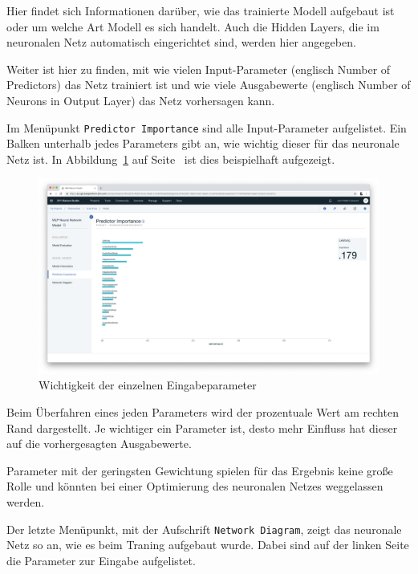 Hier findet sich Informationen darüber, wie das trainierte Modell aufgebaut ist oder um welche Art Modell es sich
handelt. Auch die Hidden Layers, die im neuronalen Netz automatisch eingerichtet sind, werden hier angegeben.

Weiter ist hier zu finden, mit wie vielen Input-Parameter (englisch Number of Predictors) das Netz trainiert ist und wie
viele Ausgabewerte (englisch Number of Neurons in Output Layer) das Netz vorhersagen kann.

Im Menüpunkt \texttt{Predictor Importance} sind alle Input-Parameter aufgelistet. Ein Balken unterhalb jedes Parameters
gibt an, wie wichtig dieser für das neuronale Netz ist. In Abbildung~\ref{fig:umsetzung_model_predictor} auf
Seite~\pageref{fig:umsetzung_model_predictor} ist dies beispielhaft aufgezeigt.

\begin{figure}[h]
    \centering
    \includegraphics[width=\textwidth]{images/kapitel_3/model_predictor.png}
    \caption{Wichtigkeit der einzelnen Eingabeparameter}
    \label{fig:umsetzung_model_predictor}
\end{figure}

Beim Überfahren eines jeden Parameters wird der prozentuale Wert am rechten Rand dargestellt. Je wichtiger ein Parameter
ist, desto mehr Einfluss hat dieser auf die vorhergesagten Ausgabewerte.

Parameter mit der geringsten Gewichtung spielen für das Ergebnis keine große Rolle und könnten bei einer Optimierung des
neuronalen Netzes weggelassen werden.

Der letzte Menüpunkt, mit der Aufschrift \texttt{Network Diagram}, zeigt das neuronale Netz so an, wie es beim Traning
aufgebaut wurde. Dabei sind auf der linken Seite die Parameter zur Eingabe aufgelistet.

